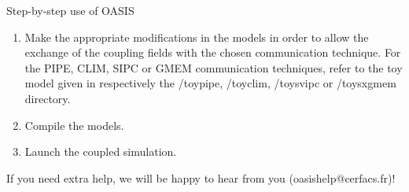 \begin{section}{Step-by-step use of OASIS}
\begin{enumerate}
\item Make the appropriate modifications in the models in order to allow
the exchange of the coupling fields with the chosen communication technique.
For the PIPE, CLIM, SIPC or GMEM communication techniques, refer 
to the toy model given in respectively the /toypipe, /toyclim, /toysvipc 
or /toysxgmem directory.

\item Compile the models.

\item Launch the coupled simulation.

\end{enumerate}

 If you need extra help, we will be happy to
hear from you (oasishelp@cerfacs.fr)!



\end{section}

